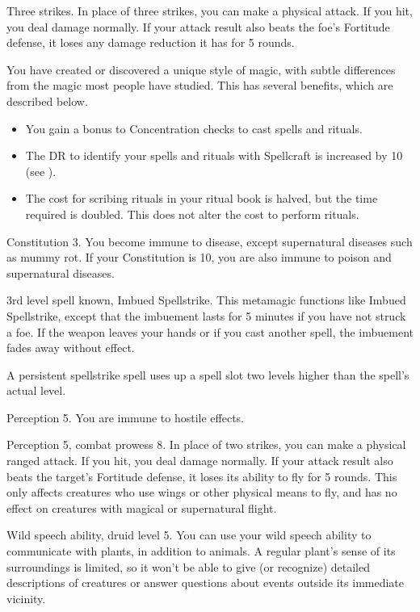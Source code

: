 \featpre Three strikes.
\featben In place of three strikes, you can make a physical attack.
If you hit, you deal damage normally.
If your attack result also beats the foe's Fortitude defense, it loses any damage reduction it has for 5 rounds.

\featben You have created or discovered a unique style of magic, with subtle differences from the magic most people have studied.
This has several benefits, which are described below.
\begin{itemize}
    \item You gain a  bonus to Concentration checks to cast spells and rituals.
    \item The DR to identify your spells and rituals with Spellcraft is increased by 10 (see ).
    \item The cost for scribing rituals in your ritual book is halved, but the time required is doubled.
        This does not alter the cost to perform rituals.
\end{itemize}

\featpre Constitution 3.
\featben You become immune to disease, except supernatural diseases such as mummy rot.
If your Constitution is 10, you are also immune to poison and supernatural diseases.

\featpres 3rd level spell known, Imbued Spellstrike.
\featben This metamagic functions like Imbued Spellstrike, except that the imbuement lasts for 5 minutes if you have not struck a foe.
If the weapon leaves your hands or if you cast another spell, the imbuement fades away without effect.

A persistent spellstrike spell uses up a spell slot two levels higher than the spell's actual level.

\featpre Perception 5.
\featben You are immune to hostile  effects.

\featpre Perception 5, combat prowess 8.
\featben In place of two strikes, you can make a physical ranged attack.
If you hit, you deal damage normally.
If your attack result also beats the target's Fortitude defense, it loses its ability to fly for 5 rounds.
This only affects creatures who use wings or other physical means to fly, and has no effect on creatures with magical or supernatural flight.

\featpre Wild speech ability, druid level 5.
\featben You can use your wild speech ability to communicate with plants, in addition to animals.
A regular plant's sense of its surroundings is limited, so it won't be able to give (or recognize) detailed descriptions of creatures or answer questions about events outside its immediate vicinity.

